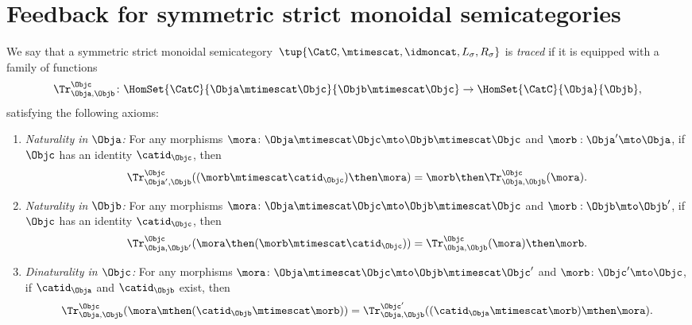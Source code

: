 \section{Feedback for symmetric strict monoidal semicategories}

\begin{ctdefinition}
    \label{def:traced-fun-stack-scat}
    We say that a symmetric strict monoidal semicategory~$\tup{\CatC,\mtimescat, \idmoncat, L_\sigma, R_\sigma}$ is \emph{traced} if it is equipped with a family of functions
    \begin{equation}
        \Tr_{\Obja,\Objb}^\Objc\colon \HomSet{\CatC}{\Obja \mtimescat \Objc}{\Objb\mtimescat \Objc}\to \HomSet{\CatC}{\Obja}{\Objb},
    \end{equation}
    satisfying the following axioms:
    \begin{enumerate}

        \item \emph{Naturality in $\Obja$:} For any morphisms $\mora\colon \Obja\mtimescat \Objc \mto \Objb\mtimescat \Objc$ and $\morb : \Obja' \mto \Obja$, if $\Objc$ has an identity $\catid_\Objc$, then
              \begin{equation}
                  \Tr_{\Obja', \Objb}^\Objc ( (\morb \mtimescat \catid_\Objc) \then \mora) = \morb \then \Tr_{\Obja, \Objb}^\Objc (\mora).
              \end{equation}

        \item \emph{Naturality in $\Objb$:}
              For any morphisms $\mora\colon \Obja\mtimescat \Objc \mto \Objb\mtimescat \Objc$ and $\morb : \Objb \mto \Objb'$, if $\Objc$ has an identity $\catid_\Objc$, then
              \begin{equation}
                  \Tr_{\Obja, \Objb'}^\Objc ( \mora \then (\morb \mtimescat \catid_\Objc) ) =  \Tr_{\Obja, \Objb}^\Objc (\mora) \then \morb.
              \end{equation}

        \item \emph{Dinaturality in $\Objc$:}
              For any morphisms $\mora \colon \Obja \mtimescat \Objc \mto \Objb \mtimescat \Objc'$ and $\morb \colon \Objc' \mto \Objc$, if $\catid_\Obja$ and $\catid_\Objb$ exist, then
              \begin{equation}
                  \Tr_{\Obja, \Objb}^{\Objc} (\mora \mthen (\catid_\Objb \mtimescat \morb)) = \Tr_{\Obja, \Objb}^{\Objc'}((\catid_\Obja \mtimescat \morb) \mthen \mora).
              \end{equation}


\end{enumerate}
\end{ctdefinition}
